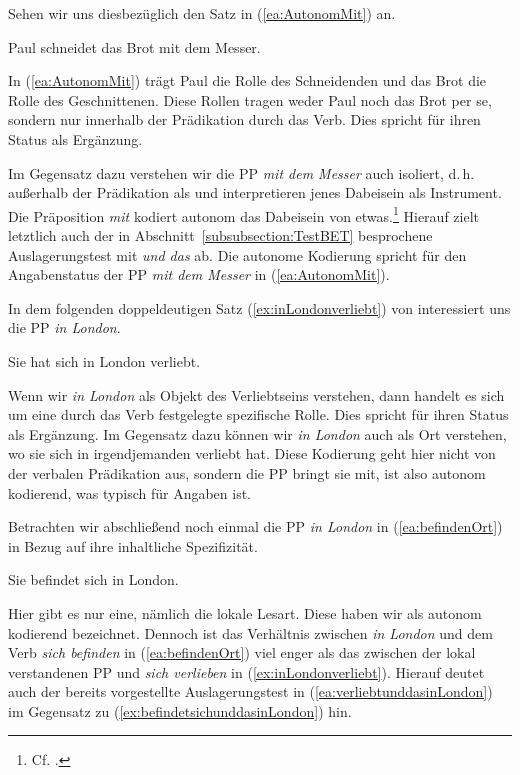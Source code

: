  Sehen wir uns diesbezüglich den Satz in (\ref{ea:AutonomMit}) an.
 
 \ea \label{ea:AutonomMit} Paul schneidet das Brot mit dem Messer.
\z 

In (\ref{ea:AutonomMit}) trägt Paul die Rolle des Schneidenden und das Brot die Rolle des Geschnittenen. Diese Rollen tragen weder Paul noch das Brot per se, sondern nur innerhalb der Prädikation durch das Verb. Dies spricht für ihren Status als Ergänzung.

Im Gegensatz dazu verstehen wir die PP \textit{mit dem Messer} auch isoliert, d.\,h. außerhalb der Prädikation als  und interpretieren jenes Dabeisein als Instrument. Die Präposition \textit{mit} kodiert autonom das Dabeisein von etwas.\footnote{Cf. \citet[118]{Coseriu1970}.} Hierauf zielt letztlich auch der in Abschnitt~\ref{subsubsection:TestBET} besprochene Auslagerungstest mit \textit{und das} ab. Die autonome Kodierung spricht für den Angabenstatus der PP \textit{mit dem Messer} in (\ref{ea:AutonomMit}).

In dem folgenden doppeldeutigen Satz (\ref{ex:inLondonverliebt}) von \citet[259]{Fischer2001} interessiert uns die PP \textit{in London}. 

\ea \label{ex:inLondonverliebt} Sie hat sich in London verliebt.
\z 

Wenn wir \textit{in London} als Objekt des Verliebtseins verstehen, dann handelt es sich um eine durch das Verb festgelegte spezifische Rolle. Dies spricht für ihren Status als Ergänzung. Im Gegensatz dazu können wir \textit{in London} auch als Ort verstehen, wo sie sich in irgendjemanden verliebt hat. Diese Kodierung geht hier nicht von der verbalen Prädikation aus, sondern die PP bringt sie mit, ist also autonom kodierend, was typisch für Angaben ist.

Betrachten wir abschließend noch einmal die PP \textit{in London} in (\ref{ea:befindenOrt}) in Bezug auf ihre inhaltliche Spezifizität. 

\ea \label{ea:befindenOrt} Sie befindet sich in London. 
\z 

Hier gibt es nur eine, nämlich die lokale Lesart. Diese haben wir als autonom kodierend bezeichnet. Dennoch ist das Verhältnis zwischen \textit{in London} und dem Verb \textit{sich befinden} in (\ref{ea:befindenOrt}) viel enger als das zwischen der lokal verstandenen PP und \textit{sich verlieben} in (\ref{ex:inLondonverliebt}). Hierauf deutet auch der bereits vorgestellte Auslagerungstest in (\ref{ea:verliebtunddasinLondon}) im Gegensatz zu (\ref{ex:befindetsichunddasinLondon}) hin. 

